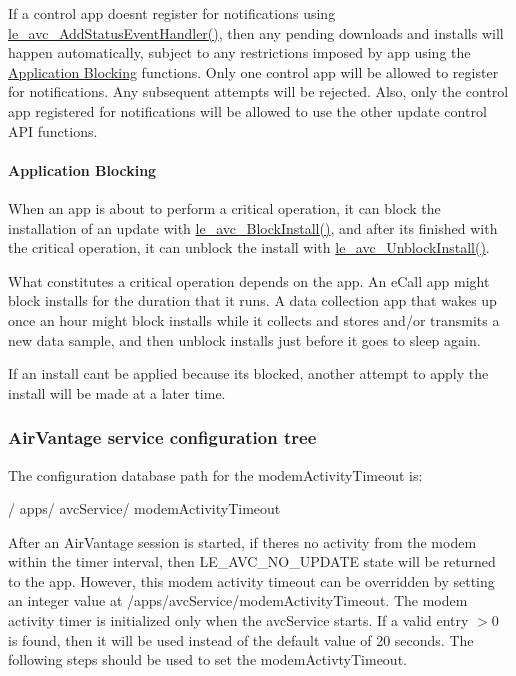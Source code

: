 If a control app doesn\textquotesingle{}t register for notifications using \hyperlink{le__avc__interface_8h_ac5443791a6e4b8db75342f45fa2f91dc}{le\+\_\+avc\+\_\+\+Add\+Status\+Event\+Handler()}, then any pending downloads and installs will happen automatically, subject to any restrictions imposed by app using the \hyperlink{c_le_avc_c_le_avc_update_app}{Application Blocking} functions. Only one control app will be allowed to register for notifications. Any subsequent attempts will be rejected. Also, only the control app registered for notifications will be allowed to use the other update control A\+P\+I functions.\hypertarget{c_le_avc_c_le_avc_update_app}{}\paragraph{Application Blocking}\label{c_le_avc_c_le_avc_update_app}
When an app is about to perform a critical operation, it can block the installation of an update with \hyperlink{le__avc__interface_8h_a4d298bc6d814481205c4db5d24812694}{le\+\_\+avc\+\_\+\+Block\+Install()}, and after it\textquotesingle{}s finished with the critical operation, it can unblock the install with \hyperlink{le__avc__interface_8h_af5b3dffdd29b7de3288ea1a88c0ecd4e}{le\+\_\+avc\+\_\+\+Unblock\+Install()}.

What constitutes a critical operation depends on the app. An e\+Call app might block installs for the duration that it runs. A data collection app that wakes up once an hour might block installs while it collects and stores and/or transmits a new data sample, and then unblock installs just before it goes to sleep again.

If an install can\textquotesingle{}t be applied because it\textquotesingle{}s blocked, another attempt to apply the install will be made at a later time.\hypertarget{c_le_avc_le_avcService_configdb}{}\subsubsection{Air\+Vantage service configuration tree}\label{c_le_avc_le_avcService_configdb}
The configuration database path for the modem\+Activity\+Timeout is\+: \begin{DoxyVerb}/
    apps/
        avcService/
                 modemActivityTimeout
\end{DoxyVerb}


After an Air\+Vantage session is started, if there\textquotesingle{}s no activity from the modem within the timer interval, then L\+E\+\_\+\+A\+V\+C\+\_\+\+N\+O\+\_\+\+U\+P\+D\+A\+T\+E state will be returned to the app. However, this modem activity timeout can be overridden by setting an integer value at /apps/avc\+Service/modem\+Activity\+Timeout. The modem activity timer is initialized only when the avc\+Service starts. If a valid entry $>$0 is found, then it will be used instead of the default value of 20 seconds. The following steps should be used to set the modem\+Activty\+Timeout.

